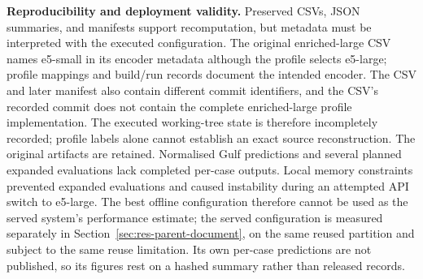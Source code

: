 \noindent\textbf{Reproducibility and deployment validity.}
Preserved CSVs, JSON summaries, and manifests support recomputation, but
metadata must be interpreted with the executed configuration. The original
enriched-large CSV names e5-small in its encoder metadata although the
profile selects e5-large; profile mappings and build/run records document
the intended encoder. The CSV and later manifest also contain different
commit identifiers, and the CSV's recorded commit does not contain the
complete enriched-large profile implementation. The executed working-tree
state is therefore incompletely recorded; profile labels alone cannot
establish an exact source reconstruction. The original artifacts are retained. Normalised Gulf
predictions and several planned expanded evaluations lack completed per-case
outputs. Local memory constraints prevented expanded evaluations and
caused instability during an attempted API switch to e5-large. The
best offline configuration therefore cannot be used as the served
system's performance estimate; the served configuration is measured
separately in Section~\ref{sec:res-parent-document}, on the same reused
partition and subject to the same reuse limitation. Its own per-case
predictions are not published, so its figures rest on a hashed summary
rather than released records.
